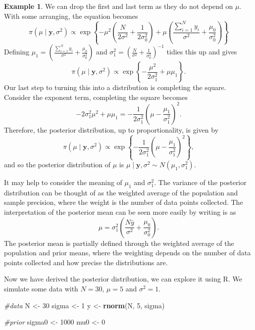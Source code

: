 \documentclass[
]{book}
\newenvironment{Shaded}{\begin{snugshade}}{\end{snugshade}}
\newcommand{\CommentTok}[1]{\textcolor[rgb]{0.56,0.35,0.01}{\textit{#1}}}
\newcommand{\DecValTok}[1]{\textcolor[rgb]{0.00,0.00,0.81}{#1}}
\newcommand{\FunctionTok}[1]{\textcolor[rgb]{0.13,0.29,0.53}{\textbf{#1}}}
\newcommand{\NormalTok}[1]{#1}
\newcommand{\OtherTok}[1]{\textcolor[rgb]{0.56,0.35,0.01}{#1}}
\theoremstyle{definition}
\theoremstyle{definition}
\newtheorem{example}{Example}[chapter]
\theoremstyle{definition}
\theoremstyle{definition}
\theoremstyle{remark}
\begin{document}
\begin{example}
We can drop the first and last term as they do not depend on \(\mu\). With some arranging, the equation becomes
\[
\pi(\mu \mid \boldsymbol{y}, \sigma^2) \propto \exp\left\{-\mu^2\left(\frac{N}{2\sigma^2}  + \frac{1}{2\sigma_0^2}\right) + \mu\left(\frac{\sum_{i=1}^{N}y_i}{\sigma^2} + \frac{\mu_0}{\sigma_0^2} \right)  \right\}
\]
Defining \(\mu_1 =\left(\frac{\sum_{i=1}^{N}y_i}{\sigma^2} + \frac{\mu_0}{\sigma_0^2} \right)\) and \(\sigma^2_1 = \left(\frac{N}{\sigma^2} + \frac{1}{\sigma_0^2}\right)^{-1}\) tidies this up and gives
\[
\pi(\mu \mid \boldsymbol{y}, \sigma^2) \propto \exp\left\{-\frac{\mu^2}{2\sigma_1^2} + \mu\mu_1 \right\}.
\]
Our last step to turning this into a distribution is completing the square. Consider the exponent term, completing the square becomes
\[
-2\sigma_1^2\mu^2 + \mu\mu_1 = -\frac{1}{2\sigma^2_1}\left(\mu - \frac{\mu_1}{\sigma_1^2} \right)^2.
\]
Therefore, the posterior distribution, up to proportionality, is given by
\[
\pi(\mu \mid \boldsymbol{y}, \sigma^2) \propto \exp\left\{-\frac{1}{2\sigma^2_1}\left(\mu - \frac{\mu_1}{\sigma_1^2} \right)^2\right\},
\]
and so the posterior distribution of \(\mu\) is \(\mu \mid \boldsymbol{y}, \sigma^2 \sim N(\mu_1, \sigma^2_1)\).

It may help to consider the meaning of \(\mu_1\) and \(\sigma^2_1\). The variance of the posterior distribution can be thought of as the weighted average of the population and sample precision, where the weight is the number of data points collected. The interpretation of the posterior mean can be seen more easily by writing is as
\[
\mu  = \sigma_1^2\left(\frac{N\bar{y}}{\sigma^2} + \frac{\mu_0}{\sigma_0^2} \right).
\]
The posterior mean is partially defined through the weighted average of the population and prior means, where the weighting depends on the number of data points collected and how precise the distributions are.

Now we have derived the posterior distribution, we can explore it using R. We simulate some data with \(N = 30\), \(\mu = 5\) and \(\sigma^2 = 1\).

\begin{Shaded}
\begin{Highlighting}[]
\CommentTok{\#data}
\NormalTok{N }\OtherTok{\textless{}{-}} \DecValTok{30}
\NormalTok{sigma }\OtherTok{\textless{}{-}} \DecValTok{1}
\NormalTok{y }\OtherTok{\textless{}{-}} \FunctionTok{rnorm}\NormalTok{(N, }\DecValTok{5}\NormalTok{, sigma)}

\CommentTok{\#prior}
\NormalTok{sigma0 }\OtherTok{\textless{}{-}} \DecValTok{1000}
\NormalTok{mu0     }\OtherTok{\textless{}{-}} \DecValTok{0}


\end{Highlighting}
\end{Shaded}
\end{example}
\end{document}
